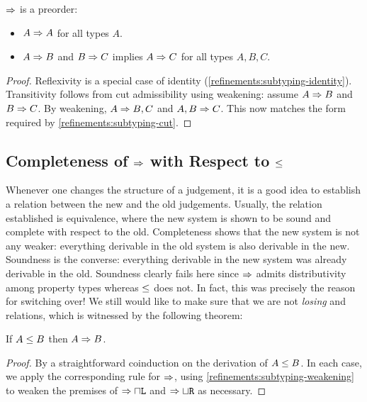 \begin{corollary}
  \label{refinements:sub-is-preorder}
  $\mathrel\Rightarrow$ is a preorder:
  \begin{itemize}
    \item $A \mathrel\Rightarrow A$ for all types $A$.
    \item $A \mathrel\Rightarrow B$ and $B \mathrel\Rightarrow C$ implies $A \mathrel\Rightarrow C$ for all types $A, B, C$.
  \end{itemize}
\end{corollary}
\begin{proof}
  Reflexivity is a special case of identity (\cref{refinements:subtyping-identity}). Transitivity follows from cut admissibility using weakening: assume $A \mathrel\Rightarrow B$ and $B \mathrel\Rightarrow C$. By weakening, $A \mathrel\Rightarrow B, C$ and $A, B \mathrel\Rightarrow C$. This now matches the form required by \cref{refinements:subtyping-cut}.
\end{proof}


\subsection{Completeness of \texorpdfstring{$\mathrel\Rightarrow$}{Algorithmic Subtyping} with Respect to \texorpdfstring{$\le$}{Declarative Subtyping}}

Whenever one changes the structure of a judgement, it is a good idea to establish a relation between the new and the old judgements. Usually, the relation established is equivalence, where the new system is shown to be sound and complete with respect to the old. Completeness shows that the new system is not any weaker: everything derivable in the old system is also derivable in the new. Soundness is the converse: everything derivable in the new system was already derivable in the old. Soundness clearly fails here since $\mathrel\Rightarrow$ admits distributivity among property types whereas $\le$ does not. In fact, this was precisely the reason for switching over! We still would like to make sure that we are not \emph{losing} and relations, which is witnessed by the following theorem:

\begin{theorem}
  If $A \le B$ then $A \mathrel\Rightarrow B$.
\end{theorem}
\begin{proof}
  By a straightforward coinduction on the derivation of $A \le B$. In each case, we apply the corresponding rule for $\mathrel\Rightarrow$, using \cref{refinements:subtyping-weakening} to weaken the premises of $\mathrel\Rightarrow{\mathbin{\sqcap}\texttt{L}}$ and $\mathrel\Rightarrow{\mathbin{\sqcup}\texttt{R}}$ as necessary.
\end{proof}

